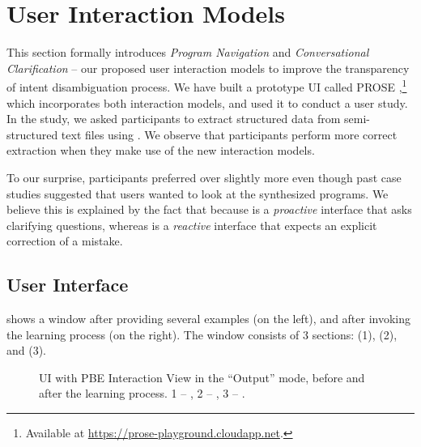 \section{User Interaction Models}
\label{sec:interactive:models}

This section formally introduces \emph{Program Navigation} and \emph{Conversational Clarification} -- our proposed user
interaction models to improve the transparency of intent disambiguation process.
We have built a prototype UI called PROSE \FlashProg,\footnote{Available at
\url{https://prose-playground.cloudapp.net}.} which incorporates both interaction models, and used it to conduct a user
study.
In the study, we asked participants to extract structured data from semi-structured text files using \FlashProg.
We observe that participants perform more correct extraction when they
make use of the new interaction models.

To our surprise, participants preferred \ConversationalClarification over \ProgramNavigation slightly more even though
past case studies suggested that users wanted to look at the synthesized programs.
We believe this is explained by the fact that
because \ConversationalClarification is a \emph{proactive} interface that asks clarifying questions, whereas
\ProgramNavigation is a \emph{reactive} interface that expects an explicit correction of a mistake.

\subsection{User Interface}

 shows a \FlashProg window after providing several examples (on the left), and after
invoking the learning process (on the right).
The \FlashProg window consists of 3 sections: \TopToolbarView (1), \InputTextView (2), and \PBEView (3).

\begin{figure}[p!]
    \centering
    \uwsinglespace
    \begin{tcbraster}[beamer, raster columns=1, size=minimal]
        \centering
    \end{tcbraster}
    \vspace*{\baselineskip}
    \begin{tcbraster}[beamer, raster columns=1, size=minimal]
        \centering
    \end{tcbraster}
    \caption{\FlashProg UI with PBE Interaction View in the ``Output'' mode, before and after the learning process.
        1 -- \TopToolbarView, 2 -- \InputTextView, 3 -- \PBEView.}
    \label{fig:interactive:ui:overview}
\end{figure}

